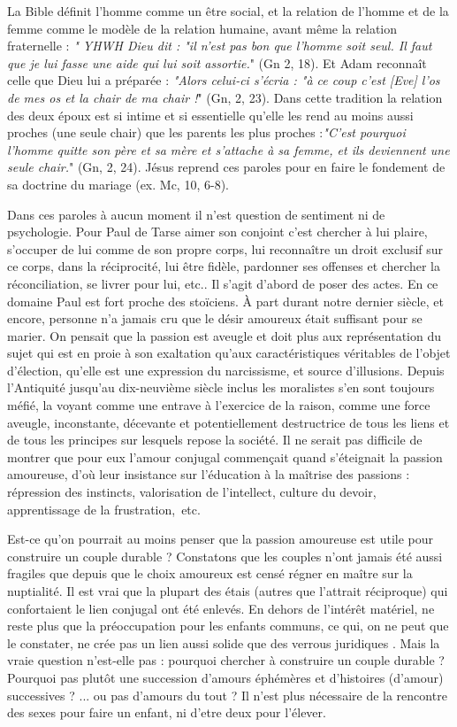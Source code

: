  La Bible définit l'homme comme un être social, et la relation de l'homme et de la femme comme le modèle de la relation humaine, avant même la relation fraternelle : \emph{" YHWH Dieu dit : "il n'est pas bon que l'homme soit seul. Il faut que je lui fasse une aide qui lui soit assortie.}" (Gn 2, 18). Et Adam reconnaît celle que Dieu lui a préparée : \emph{"Alors celui-ci s'écria : "à ce coup c'est [Eve] l'os de mes os et la chair de ma chair !}" (Gn, 2, 23). Dans cette tradition la relation des deux époux est si intime et si essentielle qu'elle les rend au moins aussi proches (une seule chair) que les parents les plus proches :\emph{"C'est pourquoi l'homme quitte son père et sa mère et s'attache à sa femme, et ils deviennent une seule chair.}" (Gn, 2, 24). Jésus reprend ces paroles pour en faire le fondement de sa doctrine du mariage (ex. Mc, 10, 6-8). 
 
 Dans ces paroles  à aucun moment il n'est question de sentiment ni de psychologie. Pour Paul de Tarse aimer son conjoint c'est chercher à lui plaire, s'occuper de lui comme de son propre corps, lui reconnaître un droit exclusif sur ce corps, dans la réciprocité, lui être fidèle, pardonner ses offenses et chercher la réconciliation, se livrer pour lui, etc.. Il s'agit d'abord de poser des actes. En ce domaine Paul est fort proche des stoïciens. À part durant notre dernier siècle, et encore, personne n'a jamais cru que le désir amoureux était suffisant pour se marier. On pensait que la passion est aveugle et doit plus aux représentation du sujet qui est en proie à son exaltation qu'aux caractéristiques véritables de l'objet d'élection, qu'elle est une expression du narcissisme, et source d'illusions. Depuis l'Antiquité jusqu'au dix-neuvième siècle inclus les moralistes s'en sont toujours méfié, la voyant comme une entrave à l'exercice de la raison, comme une force aveugle, inconstante, décevante et potentiellement destructrice de tous les liens et de tous les principes sur lesquels repose la société. Il ne serait pas difficile de montrer que pour eux l'amour conjugal commençait quand s'éteignait la passion amoureuse, d'où leur insistance sur l'éducation à la maîtrise des passions : répression des instincts, valorisation de l'intellect, culture du devoir, apprentissage de la frustration,~etc. 


 Est-ce qu'on pourrait au moins penser que la passion amoureuse est utile pour construire un couple durable ? Constatons que les couples n'ont jamais été aussi fragiles que depuis que le choix amoureux est censé régner en maître sur la nuptialité. Il est vrai que la plupart des étais (autres que l'attrait réciproque) qui confortaient le lien conjugal ont été enlevés. En dehors de l'intérêt matériel, ne reste plus que la préoccupation pour les enfants communs, ce qui, on ne peut que le constater,  ne crée pas un lien aussi solide que des verrous juridiques . Mais la vraie question n'est-elle pas : pourquoi chercher à construire un couple durable ? Pourquoi pas plutôt une succession d'amours éphémères et d'histoires (d'amour) successives ?
 ... ou pas d'amours du tout ? Il n'est plus nécessaire de la rencontre des sexes pour faire un enfant, ni d'etre deux pour l'élever.
 
